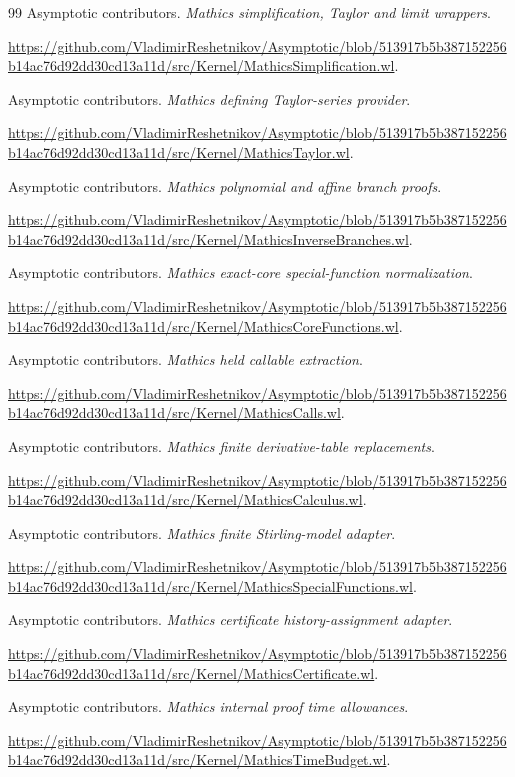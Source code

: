 \documentclass[11pt,letterpaper]{article}
\begin{document}
\begin{thebibliography}{99}
Asymptotic contributors. \emph{Mathics simplification, Taylor and limit wrappers}.\par
\url{https://github.com/VladimirReshetnikov/Asymptotic/blob/513917b5b387152256b14ac76d92dd30cd13a11d/src/Kernel/MathicsSimplification.wl}.

Asymptotic contributors. \emph{Mathics defining Taylor-series provider}.\par
\url{https://github.com/VladimirReshetnikov/Asymptotic/blob/513917b5b387152256b14ac76d92dd30cd13a11d/src/Kernel/MathicsTaylor.wl}.

Asymptotic contributors. \emph{Mathics polynomial and affine branch proofs}.\par
\url{https://github.com/VladimirReshetnikov/Asymptotic/blob/513917b5b387152256b14ac76d92dd30cd13a11d/src/Kernel/MathicsInverseBranches.wl}.

Asymptotic contributors. \emph{Mathics exact-core special-function normalization}.\par
\url{https://github.com/VladimirReshetnikov/Asymptotic/blob/513917b5b387152256b14ac76d92dd30cd13a11d/src/Kernel/MathicsCoreFunctions.wl}.

Asymptotic contributors. \emph{Mathics held callable extraction}.\par
\url{https://github.com/VladimirReshetnikov/Asymptotic/blob/513917b5b387152256b14ac76d92dd30cd13a11d/src/Kernel/MathicsCalls.wl}.

Asymptotic contributors. \emph{Mathics finite derivative-table replacements}.\par
\url{https://github.com/VladimirReshetnikov/Asymptotic/blob/513917b5b387152256b14ac76d92dd30cd13a11d/src/Kernel/MathicsCalculus.wl}.

Asymptotic contributors. \emph{Mathics finite Stirling-model adapter}.\par
\url{https://github.com/VladimirReshetnikov/Asymptotic/blob/513917b5b387152256b14ac76d92dd30cd13a11d/src/Kernel/MathicsSpecialFunctions.wl}.

Asymptotic contributors. \emph{Mathics certificate history-assignment adapter}.\par
\url{https://github.com/VladimirReshetnikov/Asymptotic/blob/513917b5b387152256b14ac76d92dd30cd13a11d/src/Kernel/MathicsCertificate.wl}.

Asymptotic contributors. \emph{Mathics internal proof time allowances}.\par
\url{https://github.com/VladimirReshetnikov/Asymptotic/blob/513917b5b387152256b14ac76d92dd30cd13a11d/src/Kernel/MathicsTimeBudget.wl}.


\end{thebibliography}
\end{document}
